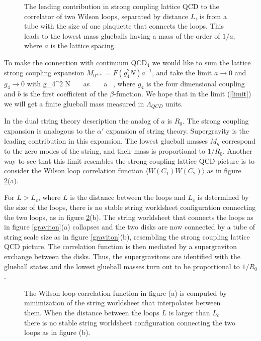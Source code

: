 \begin{figure}[htb]
\begin{center}
\epsfxsize=1.6in\leavevmode{}
\end{center}
\caption{The leading contribution in strong coupling lattice
QCD to the correlator of
two Wilson loops, separated by distance $L$,
is from a tube with the size of one plaquette
that connects the loops. 
This leads to the lowest mass glueballs having a mass of the order of
$1/a$, where $a$ is the lattice spacing.
}
\label{glueball}
\end{figure} 



To make the connection with continuum QCD$_4$ we would like to sum the
lattice strong coupling expansion $M_{0^{++}} = F(g_{4}^2 N) a^{-1}$,
and take the limit $a \to 0$ and $g_4 \to 0$ with
\beq
g_{4}^2 N \simeq 
{}~~~as~~~~a  \ ,
\label{limit}
\eeq
where $g_4$ is the four dimensional coupling and $b$ is the first coefficient
of the $\beta$-function.
We hope that in the limit (\ref{limit}) we will get a finite glueball mass
measured in $\Lambda_{QCD}$ units.

In the dual string theory description the analog of $a$ is $R_0$.
The strong coupling expansion is analogous to
the $\alpha'$ expansion of string theory.
Supergravity is the leading contribution in this expansion. 
The lowest glueball masses $M_g$ correspond to the zero modes
of the string, and their mass is proportional to $1/R_0$.
Another way to see that this limit 
resembles the strong coupling lattice QCD picture is 
to consider the Wilson loop correlation function
$\langle W(C_1) W(C_2) \rangle$ as in figure \ref{wilson}(a).

For $L > L_c$, where $L$ is the distance
between the loops and $L_c$ is determined by the size of the
loops, there is no stable 
string worldsheet configuration
connecting the two loops, as in figure \ref{wilson}(b).
The string worldsheet that connects the loops as in figure \ref{graviton}(a)
collapses and 
the two disks are now connected by a tube of string scale size as in 
figure \ref{graviton}(b),
resembling the strong coupling lattice QCD picture.
The correlation
function is then mediated by a supergraviton exchange between the disks.
Thus, the  supergravitons are identified with the glueball states and the 
lowest glueball masses turn out to be proportional to $1/R_0$ 
\cite{Gross:1998gk}.


\begin{figure}[htb]
\begin{center}
\epsfxsize=5in\leavevmode{}
\end{center}
\caption{The Wilson loop correlation function
in figure (a) is computed by minimization of the string worldsheet
that interpolates between them.  When the distance between the loops
$L$ is larger than $L_c$ there is no stable string worldsheet
configuration connecting the two loops as in figure (b).  }
\label{wilson}
\end{figure} 



